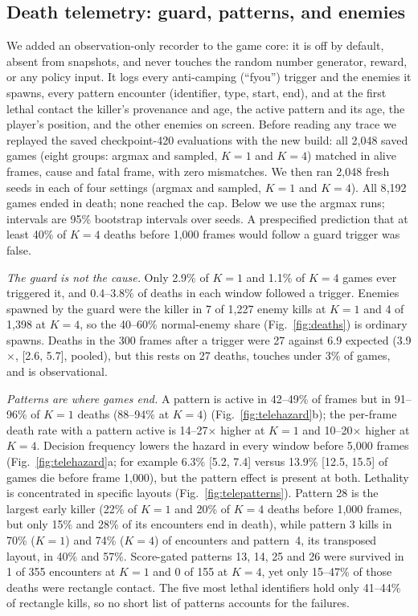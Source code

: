 \documentclass[journal]{IEEEtran}
\begin{document}
\subsection{Death telemetry: guard, patterns, and enemies}\label{sec:telemetry}
We added an observation-only recorder to the game core: it is off by default, absent from snapshots, and never touches the random number generator, reward, or any policy input. It logs every anti-camping (``fyou'') trigger and the enemies it spawns, every pattern encounter (identifier, type, start, end), and at the first lethal contact the killer's provenance and age, the active pattern and its age, the player's position, and the other enemies on screen. Before reading any trace we replayed the saved checkpoint-420 evaluations with the new build: all 2{,}048 saved games (eight groups: argmax and sampled, $K{=}1$ and $K{=}4$) matched in alive frames, cause and fatal frame, with zero mismatches. We then ran 2{,}048 fresh seeds in each of four settings (argmax and sampled, $K{=}1$ and $K{=}4$). All 8{,}192 games ended in death; none reached the cap. Below we use the argmax runs; intervals are 95\% bootstrap intervals over seeds. A prespecified prediction that at least 40\% of $K{=}4$ deaths before 1{,}000 frames would follow a guard trigger was false.

\textit{The guard is not the cause.} Only 2.9\% of $K{=}1$ and 1.1\% of $K{=}4$ games ever triggered it, and 0.4--3.8\% of deaths in each window followed a trigger. Enemies spawned by the guard were the killer in 7 of 1{,}227 enemy kills at $K{=}1$ and 4 of 1{,}398 at $K{=}4$, so the 40--60\% normal-enemy share (Fig.~\ref{fig:deaths}) is ordinary spawns. Deaths in the 300 frames after a trigger were 27 against 6.9 expected (3.9$\times$, [2.6, 5.7], pooled), but this rests on 27 deaths, touches under 3\% of games, and is observational.

\textit{Patterns are where games end.} A pattern is active in 42--49\% of frames but in 91--96\% of $K{=}1$ deaths (88--94\% at $K{=}4$) (Fig.~\ref{fig:telehazard}b); the per-frame death rate with a pattern active is 14--27$\times$ higher at $K{=}1$ and 10--20$\times$ higher at $K{=}4$. Decision frequency lowers the hazard in every window before 5{,}000 frames (Fig.~\ref{fig:telehazard}a; for example 6.3\% [5.2, 7.4] versus 13.9\% [12.5, 15.5] of games die before frame 1{,}000), but the pattern effect is present at both. Lethality is concentrated in specific layouts (Fig.~\ref{fig:telepatterns}). Pattern 28 is the largest early killer (22\% of $K{=}1$ and 20\% of $K{=}4$ deaths before 1{,}000 frames, but only 15\% and 28\% of its encounters end in death), while pattern 3 kills in 70\% ($K{=}1$) and 74\% ($K{=}4$) of encounters and pattern~4, its transposed layout, in 40\% and 57\%. Score-gated patterns 13, 14, 25 and 26 were survived in 1 of 355 encounters at $K{=}1$ and 0 of 155 at $K{=}4$, yet only 15--47\% of those deaths were rectangle contact. The five most lethal identifiers hold only 41--44\% of rectangle kills, so no short list of patterns accounts for the failures.
\end{document}
